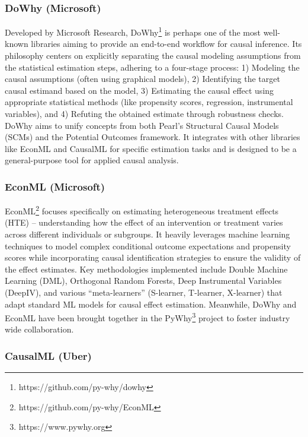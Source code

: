 {\subsubsection{DoWhy (Microsoft)}

Developed by Microsoft Research, DoWhy\footnote{https://github.com/py-why/dowhy} \cite{sharma2020dowhy} is perhaps one of the most well-known libraries aiming to provide an end-to-end workflow for causal inference. Its philosophy centers on explicitly separating the causal modeling assumptions from the statistical estimation steps, adhering to a four-stage process: 1) Modeling the causal assumptions (often using graphical models), 2) Identifying the target causal estimand based on the model, 3) Estimating the causal effect using appropriate statistical methods (like propensity scores, regression, instrumental variables), and 4) Refuting the obtained estimate through robustness checks. DoWhy aims to unify concepts from both Pearl's Structural Causal Models (SCMs) and the Potential Outcomes framework. It integrates with other libraries like EconML and CausalML for specific estimation tasks and is designed to be a general-purpose tool for applied causal analysis.

\subsubsection{EconML (Microsoft)}

EconML\footnote{https://github.com/py-why/EconML} \cite{oprescu2019econml} focuses specifically on estimating heterogeneous treatment effects (HTE) – understanding how the effect of an intervention or treatment varies across different individuals or subgroups. It heavily leverages machine learning techniques to model complex conditional outcome expectations and propensity scores while incorporating causal identification strategies to ensure the validity of the effect estimates. Key methodologies implemented include Double Machine Learning (DML), Orthogonal Random Forests, Deep Instrumental Variables (DeepIV), and various ``meta-learners'' (S-learner, T-learner, X-learner) that adapt standard ML models for causal effect estimation. Meanwhile, DoWhy and EconML have been brought together in the PyWhy\footnote{https://www.pywhy.org} project to foster industry wide collaboration.

\subsubsection{CausalML (Uber)}


}
